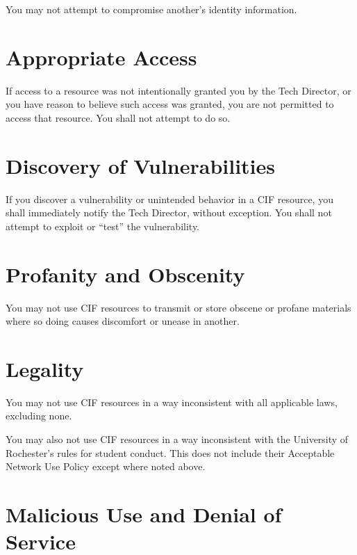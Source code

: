 \documentclass[12pt]{article}
\begin{document}
You may not attempt to compromise another's identity information.


\section{Appropriate Access} %

If access to a resource was not intentionally granted you by the Tech Director, or you have reason to believe such access was granted, you are not permitted to access that resource. You shall not attempt to do so.


\section{Discovery of Vulnerabilities} %

If you discover a vulnerability or unintended behavior in a CIF resource, you shall immediately notify the Tech Director, without exception. You shall not attempt to exploit or “test” the vulnerability.


\section{Profanity and Obscenity} %

You may not use CIF resources to transmit or store obscene or profane materials where so doing causes discomfort or unease in another.


\section{Legality} %

You may not use CIF resources in a way inconsistent with all applicable laws, excluding none.

You may also not use CIF resources in a way inconsistent with the University of Rochester's rules for student conduct. This does not include their Acceptable Network Use Policy except where noted above.


\section{Malicious Use and Denial of Service} %
\end{document}
